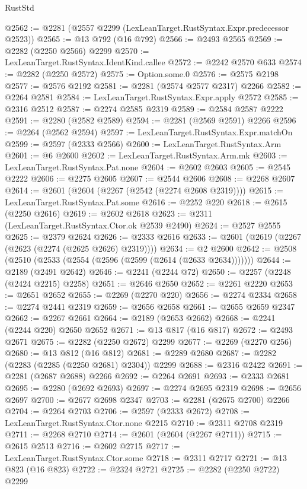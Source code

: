 \begin{lexlean}{RustStd}
\begin{coremodule}
{\begin{coremodule}
{{{{{{{{{{{{{{@2562 := @2281 (@2557 @2299 (LexLeanTarget.RustSyntax.Expr.predecessor @2523))
@2565 := @13 @792 (@16 @792)
@2566 := @2493 @2565
@2569 := @2282 (@2250 @2566) @2299
@2570 := LexLeanTarget.RustSyntax.IdentKind.callee
@2572 := @2242 @2570 @633
@2574 := @2282 (@2250 @2572)
@2575 := Option.some.{0}
@2576 := @2575 @2198
@2577 := @2576 @2192
@2581 := @2281 (@2574 @2577 @2317) @2266
@2582 := @2264 @2581
@2584 := LexLeanTarget.RustSyntax.Expr.apply @2572
@2585 := @2316 @2512
@2587 := @2274 @2585 @2319
@2589 := @2584 @2587 @2222
@2591 := @2280 (@2582 @2589)
@2594 := @2281 (@2569 @2591) @2266
@2596 := @2264 (@2562 @2594)
@2597 := LexLeanTarget.RustSyntax.Expr.matchOn
@2599 := @2597 (@2333 @2566)
@2600 := LexLeanTarget.RustSyntax.Arm
@2601 := @6 @2600
@2602 := LexLeanTarget.RustSyntax.Arm.mk
@2603 := LexLeanTarget.RustSyntax.Pat.none
@2604 := @2602 @2603
@2605 := @2545 @2222
@2606 := @2275 @2605
@2607 := @2544 @2606
@2608 := @2268 @2607
@2614 := @2601 (@2604 (@2267 (@2542 (@2274 @2608 @2319))))
@2615 := LexLeanTarget.RustSyntax.Pat.some
@2616 := @2252 @220
@2618 := @2615 (@2250 @2616)
@2619 := @2602 @2618
@2623 := @2311 (LexLeanTarget.RustSyntax.Ctor.ok @2539 @2490)
@2624 := @2527 @2555
@2625 := @2379 @2624
@2626 := @2333 @2616
@2633 := @2601 (@2619 (@2267 (@2623 (@2274 (@2625 @2626) @2319))))
@2634 := @2 @2600
@2642 := @2508 (@2510 (@2533 (@2554 (@2596 (@2599 (@2614 (@2633 @2634)))))))
@2644 := @2189 (@2491 @2642)
@2646 := @2241 (@2244 @72)
@2650 := @2257 (@2248 (@2424 @2215) @2258)
@2651 := @2646 @2650
@2652 := @2261 @2220
@2653 := @2651 @2652
@2655 := @2269 (@2270 @220)
@2656 := @2274 @2334
@2658 := @2274 @2441 @2319
@2659 := @2656 @2658
@2661 := @2655 @2659 @2347
@2662 := @2267 @2661
@2664 := @2189 (@2653 @2662)
@2668 := @2241 (@2244 @220) @2650 @2652
@2671 := @13 @817 (@16 @817)
@2672 := @2493 @2671
@2675 := @2282 (@2250 @2672) @2299
@2677 := @2269 (@2270 @256)
@2680 := @13 @812 (@16 @812)
@2681 := @2289 @2680
@2687 := @2282 (@2283 (@2285 (@2250 @2681) @2304)) @2299
@2688 := @2316 @2422
@2691 := @2281 (@2687 @2688) @2266
@2692 := @2264 @2691
@2693 := @2333 @2681
@2695 := @2280 (@2692 @2693)
@2697 := @2274 @2695 @2319
@2698 := @2656 @2697
@2700 := @2677 @2698 @2347
@2703 := @2281 (@2675 @2700) @2266
@2704 := @2264 @2703
@2706 := @2597 (@2333 @2672)
@2708 := LexLeanTarget.RustSyntax.Ctor.none @2215
@2710 := @2311 @2708 @2319
@2711 := @2268 @2710
@2714 := @2601 (@2604 (@2267 @2711))
@2715 := @2615 @2513
@2716 := @2602 @2715
@2717 := LexLeanTarget.RustSyntax.Ctor.some
@2718 := @2311 @2717
@2721 := @13 @823 (@16 @823)
@2722 := @2324 @2721
@2725 := @2282 (@2250 @2722) @2299
}}}}}}}}}}}}}}
\end{coremodule}}
\end{coremodule}
\end{lexlean}
